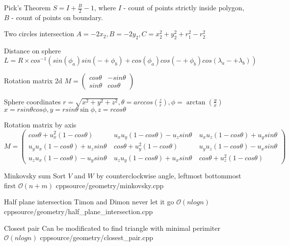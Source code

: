 \documentclass[landscape, 10pt, a4paper, oneside, twocolumn]{extarticle}
\begin{document}
\Formula
{Pick's Theorem}
{$S = I + \frac{B}{2} - 1$, where $I$ - count of points strictly inside polygon, $B$ - count of points on boundary.}

\Formula
{Two circles intersection}
{$A = -2 x_{2}, B = - 2 y_{2}, C = x_{2}^{2} + y_{2}^{2} + r_{1}^{2} - r_{2}^{2}$}

\Formula
{Distance on sphere}
{$L = R \times cos^{-1}( sin(\phi_{a}) sin(-+ \phi_{b}) + cos(\phi_{a}) cos(-+ \phi_{b}) cos(\lambda_{a} -+ \lambda_{b}) ) $}

\Formula
{Rotation matrix 2d}
{$M = \left( \begin{smallmatrix} cos\theta & - sin\theta \\ sin\theta & cos\theta \end{smallmatrix} \right)$}

\Formula
{Sphere coordinates}
{
    $r = \sqrt{x^{2} + y^{2} + z^{2}}, \theta = arccos(\frac{z}{r}), \phi = \arctan(\frac{y}{x})$ \\
    $x = r sin \theta cos \phi, y = r sin \theta \sin \phi, z = r cos \theta$ \\ 
}

\Formula
{Rotation matrix by axis}
{ $ M = 
	\left ( 
		\begin{smallmatrix} 
			cos\theta + u_{x}^{2} (1 - cos\theta) \  & u_{x} u_{y} (1 - cos\theta) - u_{z} sin\theta \ & u_{x} u_{z} (1 - cos\theta) + u_{y} sin\theta \\ 
			u_{y} u_{x} (1 - cos\theta) + u_{z} sin\theta \ & cos\theta + u_{y}^{2} (1 - cos\theta) \ & u_{y} u_{z} (1 - cos\theta) - u_{x} sin\theta \\ 
			u_{z} u_{x} (1 - cos\theta) - u_{y} sin\theta \ & u_{z} u_{y} (1 - cos\theta) + u_{x} sin\theta \ & cos\theta + u_{z}^{2} (1 - cos\theta)
		\end{smallmatrix} 
	\right ) $
}

\Algorithm
{Minkovsky sum}
{Sort $V$ and $W$ by counterclockwise angle, leftmost bottommost first}
{$\mathcal{O}(n + m)$}
{cpp}{source/geometry/minkovsky.cpp}

\Algorithm
{Half plane intersection}
{Timon and Dimon never let it go}
{$\mathcal{O}(n logn)$}
{cpp}{source/geometry/half_plane_intersection.cpp}

\Algorithm
{Closest pair}
{Can be modificated to find triangle with minimal perimiter}
{$\mathcal{O}(n logn)$}
{cpp}{source/geometry/closest_pair.cpp}
\end{document}
